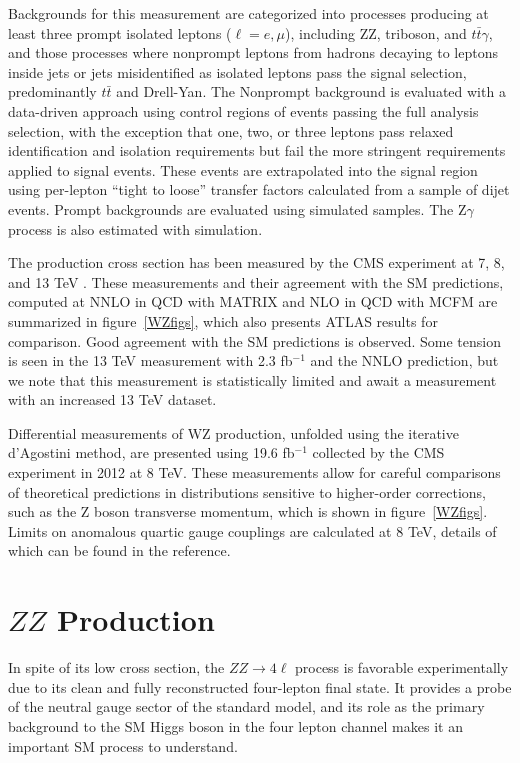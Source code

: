 \documentclass[10pt]{article}
\begin{document}
Backgrounds for this measurement are categorized into processes producing at least
three prompt isolated leptons ($\ell = e, \mu$), including ZZ, triboson, and 
$t\bar{t}\gamma$, and those processes where nonprompt
leptons from hadrons decaying to leptons inside jets or jets misidentified as isolated
leptons pass the signal selection, predominantly $t\bar{t}$ and Drell-Yan. 
The Nonprompt background is evaluated with a data-driven approach using 
control regions of events passing the full analysis selection,
with the exception that one, two, or three leptons pass relaxed identification 
and isolation requirements but fail the more stringent requirements applied to signal events.
These events are extrapolated into the signal region using per-lepton 
``tight to loose'' transfer factors
calculated from a sample of dijet events. Prompt backgrounds are evaluated using 
simulated samples. The Z$\gamma$ process is also estimated with simulation.


The production cross section has been measured by the CMS experiment at 7, 8, 
\cite{Khachatryan:2016poo}
and 13 TeV
\cite{Khachatryan:2016tgp}.
These measurements and their agreement with the SM
predictions, computed at NNLO in QCD with MATRIX and NLO in QCD with MCFM \cite{bleh}
are summarized in figure~\ref{WZfigs}, which also presents ATLAS results for comparison. 
Good agreement with the SM predictions
is observed. Some tension is seen in the 13 TeV measurement with 2.3 fb$^{-1}$
and the NNLO prediction, but we note that this measurement is statistically
limited and await a measurement with an increased 13 TeV dataset.

Differential measurements of WZ production, unfolded using the 
iterative d'Agostini \cite{bleh} method, are presented using 19.6 fb$^{-1}$
collected by the CMS experiment in 2012 at 8 TeV. These measurements allow for careful
comparisons of theoretical predictions in distributions sensitive 
to higher-order corrections, such as the Z boson transverse momentum, which is
shown in figure~\ref{WZfigs}. Limits on anomalous quartic gauge couplings are
calculated at 8 TeV, details of which can be found in the reference.


\section{$ZZ$ Production}

In spite of its low cross section, the $ZZ \rightarrow 4\ell$ process 
is favorable experimentally due to its clean and fully reconstructed 
four-lepton final state. It provides a probe of the neutral gauge sector 
of the standard model, and its role as the primary background to the SM Higgs
boson in the four lepton channel makes it an important SM 
process to understand.
\end{document}
